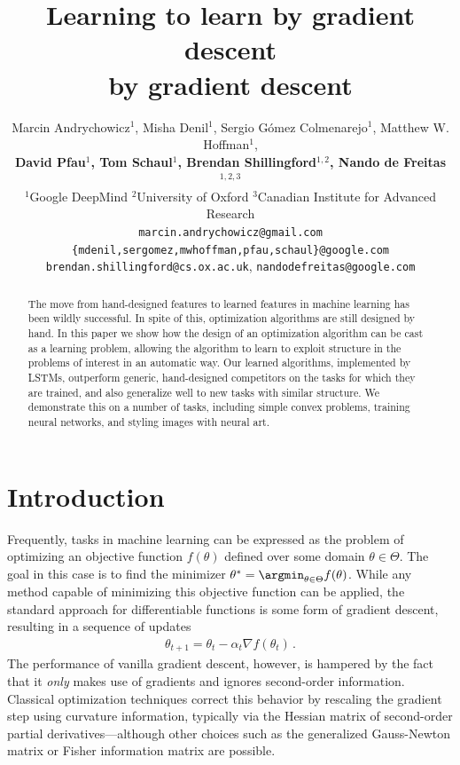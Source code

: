 \documentclass{article}
\title{Learning to learn by gradient descent\\\hspace{7.75em}by gradient descent}
\author{
Marcin Andrychowicz$^1$,
Misha Denil$^1$,
Sergio G\'omez Colmenarejo$^1$,
Matthew W. Hoffman$^1$,\\
\textbf{David Pfau$^1$,
Tom Schaul$^1$,
Brendan Shillingford$^{1,2}$,
Nando de Freitas$^{1,2,3}$}\\[0.5em]
$^1$Google DeepMind \quad $^2$University of Oxford \quad $^3$Canadian Institute for Advanced Research \\[0.5em]
\texttt{marcin.andrychowicz@gmail.com}\\
\texttt{\{mdenil,sergomez,mwhoffman,pfau,schaul\}@google.com}\\
\texttt{brendan.shillingford@cs.ox.ac.uk},
\texttt{nandodefreitas@google.com}
}
\begin{document}
\maketitle


\begin{abstract}
  The move from hand-designed features to learned features in machine learning
  has been wildly successful.  In spite of this, optimization algorithms are
  still designed by hand.  In this paper we show how the design of an
  optimization algorithm can be cast as a learning problem, allowing the
  algorithm to learn to exploit structure in the problems of interest in an
  automatic way.  Our learned algorithms, implemented by LSTMs, outperform
  generic, hand-designed competitors on the tasks for which they are trained,
  and also generalize well to new tasks with similar structure.  We demonstrate
  this on a number of tasks, including simple convex problems, training neural
  networks, and styling images with neural art.
\end{abstract}


\section{Introduction}

Frequently, tasks in machine learning can be expressed as the problem of
optimizing an objective function $f(\theta)$ defined over some domain
$\theta\in\Theta$. The goal in this case is to find the minimizer
$\theta^* =
\argmin_{\theta\in\Theta}f(\theta)$. While any method capable of minimizing
this objective function can be applied, the standard approach for
differentiable functions is some form of gradient descent, resulting in a
sequence of updates
\begin{align*}
  \theta_{t+1} = \theta_t - \alpha_t \nabla f(\theta_t)
  \,.
\end{align*}
The performance of vanilla gradient descent, however, is hampered by the fact
that it \emph{only} makes use of gradients and ignores second-order
information. Classical optimization techniques correct this behavior by
rescaling the gradient step using curvature information, typically via the
Hessian matrix of
second-order partial derivatives---although other choices such as the
generalized Gauss-Newton matrix or Fisher information matrix are possible.
\end{document}
